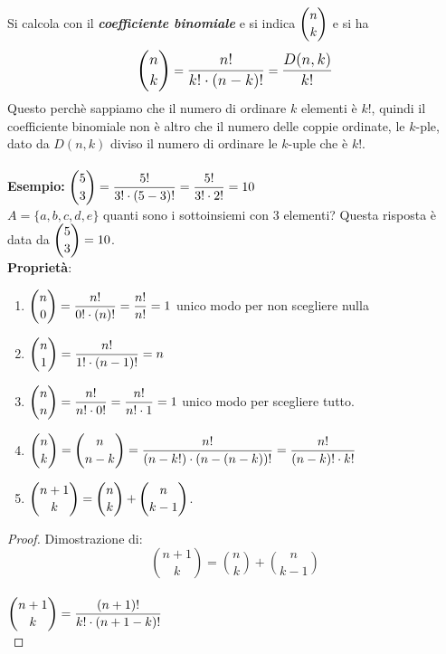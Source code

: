 \documentclass[12pt, letterpaper]{report}
\begin{document}
\begin{enumerate}
\begin{enumerate}
  				Si calcola con il \textbf{\textit{coefficiente binomiale}} e si indica $\mathlarger{\binom{n}{k}}$ e si ha
  				\[\mathlarger{\binom{n}{k}}= \mathlarger{\frac{n!}{k! \cdot (n - k)!}} =  \mathlarger{\frac{D(n, k)}{k!}}\]
  				Questo perchè sappiamo che il numero di ordinare $k$ elementi è $k!$, quindi il coefficiente binomiale non è altro che il numero delle coppie ordinate, le $k$-ple, dato da $D(n, k)$ diviso il numero di ordinare le $k$-uple che è $k!$. \\
  				\\
  				\textbf{Esempio:} $\mathlarger{\binom{5}{3} = \frac{5!}{3! \cdot (5 - 3)!} = \frac{5!}{3! \cdot 2!}} = 10$ \\
  				$A = \{a, b, c, d, e\}$ quanti sono i sottoinsiemi con 3 elementi? Questa risposta è data da $\mathlarger{\binom{5}{3}} = 10$.
  				\\
  				\textbf{Proprietà}:
  				\begin{enumerate}
  					\item $\mathlarger{\binom{n}{0} = \frac{n!}{0! \cdot (n)!} = \frac{n!}{n!} = 1}$ unico modo per non scegliere nulla
  					\item $\mathlarger{\binom{n}{1} = \frac{n!}{1! \cdot (n - 1)!} = n}$
  					\item $\mathlarger{\binom{n}{n} = \frac{n!}{n! \cdot 0!} = \frac{n!}{n! \cdot 1} = 1}$ unico modo per scegliere tutto.
  					\item $\mathlarger{\binom{n}{k} = \binom{n}{n - k} = \frac{n!}{(n - k!) \cdot (n - (n - k))!} = \frac{n!}{(n - k)! \cdot k!}}$
  					\item $\mathlarger{\binom{n + 1}{k} = \binom{n}{k} + \binom{n}{k - 1}}$.
  				\end{enumerate}
  				\begin{proof}{Dimostrazione di: \[\binom{n + 1}{k} = \binom{n}{k} + \binom{n}{k - 1}\]} \quad \\

					$\mathlarger{\binom{n + 1}{k} = \frac{(n + 1)!}{k! \cdot (n + 1 - k)!}}$ \\


\end{proof}
\end{enumerate}
\end{enumerate}
\end{document}
